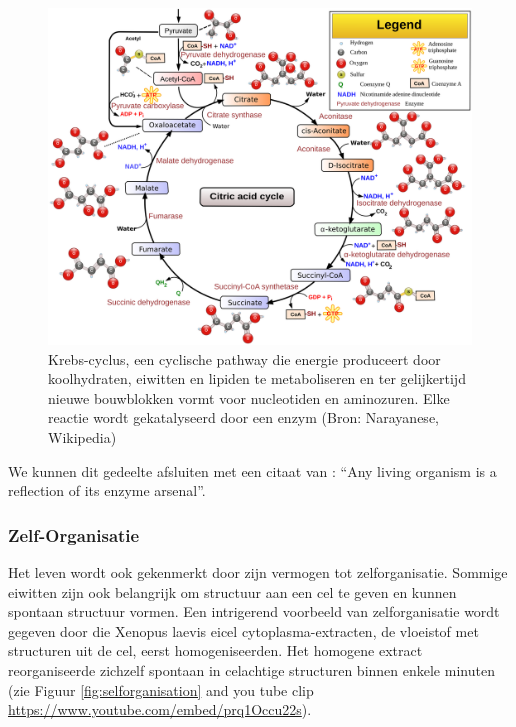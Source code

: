 \documentclass[
  11pt,
]{book}
\begin{document}
\begin{figure}

{\centering \includegraphics[width=0.7\linewidth]{./figs/Citric_acid_cycle_with_aconitate_2} 

}

\caption{ Krebs-cyclus, een cyclische pathway die energie produceert door koolhydraten, eiwitten en lipiden te metaboliseren en ter gelijkertijd nieuwe bouwblokken vormt voor nucleotiden en aminozuren. Elke reactie wordt gekatalyseerd door een enzym (Bron: Narayanese, Wikipedia)}\label{fig:krebsCycle}
\end{figure}

We kunnen dit gedeelte afsluiten met een citaat van \citet{deDuve2002}: ``Any living organism is a reflection of its enzyme arsenal''.

\pagebreak

\hypertarget{zelf-organisatie}{%
\subsubsection{Zelf-Organisatie}\label{zelf-organisatie}}

Het leven wordt ook gekenmerkt door zijn vermogen tot zelforganisatie. Sommige eiwitten zijn ook belangrijk om structuur aan een cel te geven en kunnen spontaan structuur vormen. Een intrigerend voorbeeld van zelforganisatie wordt gegeven door \citet{Cheng2019} die Xenopus laevis eicel cytoplasma-extracten, de vloeistof met structuren uit de cel, eerst homogeniseerden. Het homogene extract reorganiseerde zichzelf spontaan in celachtige structuren binnen enkele minuten (zie Figuur \ref{fig:selforganisation} and you tube clip \url{https://www.youtube.com/embed/prq1Occu22s}).
\end{document}
